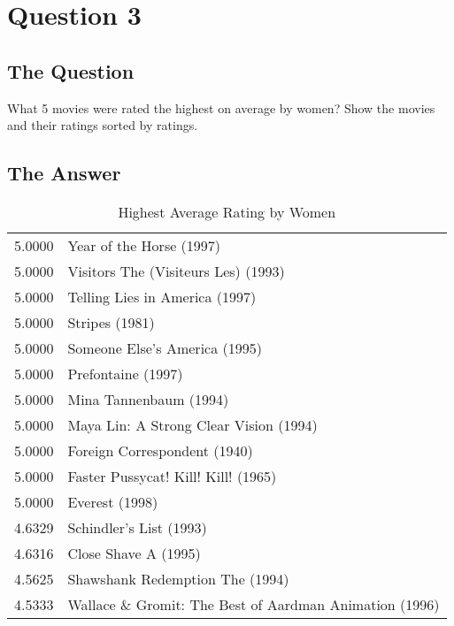 \section{Question 3}

\subsection{The Question}

\begin{flushleft}

What 5 movies were rated the highest on average by women? Show
the movies and their ratings sorted by ratings.

\end{flushleft}
\subsection{The Answer}


\begin{flushleft}

\begin{table}[h]
\centering
\begin{tabular}{ll}
5.0000 & Year of the Horse (1997)                                \\
5.0000 & Visitors The (Visiteurs Les) (1993)                     \\
5.0000 & Telling Lies in America (1997)                          \\
5.0000 & Stripes (1981)                                          \\
5.0000 & Someone Else's America (1995)                           \\
5.0000 & Prefontaine (1997)                                      \\
5.0000 & Mina Tannenbaum (1994)                                  \\
5.0000 & Maya Lin: A Strong Clear Vision (1994)                  \\
5.0000 & Foreign Correspondent (1940)                            \\
5.0000 & Faster Pussycat! Kill! Kill! (1965)                     \\
5.0000 & Everest (1998)                                          \\ \hline
4.6329 & Schindler's List (1993)                                 \\ \hline
4.6316 & Close Shave A (1995)                                    \\ \hline 
4.5625 & Shawshank Redemption The (1994)                         \\ \hline
4.5333 & Wallace \& Gromit: The Best of Aardman Animation (1996) \\
   
\end{tabular}
\caption{Highest Average Rating by Women}
\end{table}


\end{flushleft}





